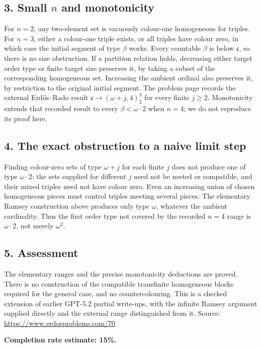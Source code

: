 \subsection*{3. Small $n$ and monotonicity}
For $n=2$, any two-element set is vacuously colour-one homogeneous for triples. For $n=3$, either a colour-one triple exists, or all triples have colour zero, in which case the initial segment of type $\beta$ works. Every countable $\beta$ is below $\mathfrak c$, so there is no size obstruction.
If a partition relation holds, decreasing either target order type or finite target size preserves it, by taking a subset of the corresponding homogeneous set. Increasing the ambient ordinal also preserves it, by restriction to the original initial segment.
The problem page records the external Erd\H{o}s--Rado result $\mathfrak c\to(\omega+j,4)^3_2$ for every finite $j\ge2$. Monotonicity extends that recorded result to every $\beta<\omega\cdot2$ when $n=4$; we do not reproduce its proof here.

\subsection*{4. The exact obstruction to a naive limit step}
Finding colour-zero sets of type $\omega+j$ for each finite $j$ does not produce one of type $\omega\cdot2$: the sets supplied for different $j$ need not be nested or compatible, and their mixed triples need not have colour zero. Even an increasing union of chosen homogeneous pieces must control triples meeting several pieces. The elementary Ramsey construction above produces only type $\omega$, whatever the ambient cardinality. Thus the first order type not covered by the recorded $n=4$ range is $\omega\cdot2$, not merely $\omega^2$.

\subsection*{5. Assessment}
The elementary ranges and the precise monotonicity deductions are proved. There is no construction of the compatible transfinite homogeneous blocks required for the general case, and no countercolouring. This is a checked extension of earlier GPT-5.2 partial write-ups, with the infinite Ramsey argument supplied directly and the external range distinguished from it.
Source: \url{https://www.erdosproblems.com/70}.

\textbf{Completion rate estimate: 15\%.}

